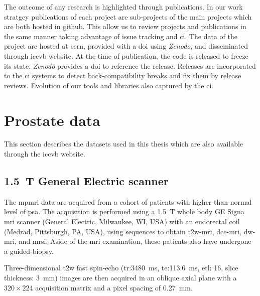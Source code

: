 The outcome of any research is highlighted through publications.
In our work stratgey publications of each project are sub-projects of the main projects which are both hosted in github.
This allow us to review projects and publications in the same manner taking advantage of issue tracking and \acs{ci}.
The data of the project are hosted at \acs{cern}, provided with a \acs{doi} using \emph{Zenodo}, and disseminated through \acs{iccvb} website.
At the time of publication, the code is released to freeze its state. 
\emph{Zenodo} provides a \acs{doi} to reference the release.
Releases are incorporated to the \acs{ci} systems to detect back-compatibility breaks and fix them by release reviews.
Evolution of our tools and libraries also captured by the \acs{ci}.

\section{Prostate data}
This section describes the datasets used in this thesis which are also available through the \acs{iccvb} website.

\subsection{\SI{1.5}{\tesla} General Electric scanner}

The \ac{mpmri} data are acquired from a cohort of patients with higher-than-normal level of \ac{psa}.
The acquisition is performed using a \SI{1.5}{\tesla} whole body GE Signa \ac{mri} scanner (General Electric, Milwaukee, WI, USA) with an endorectal coil (Medrad, Pittsburgh, PA, USA), using sequences to obtain \ac{t2w}-\ac{mri}, \ac{dce}-\ac{mri}, \ac{dw}-\ac{mri}, and \ac{mrsi}.
Aside of the \ac{mri} examination, these patients also have undergone a guided-biopsy.

Three-dimensional \ac{t2w} fast spin-echo (\ac{tr}:\SI{3480}{\ms}, \ac{te}:\SI{113.6}{\ms}, \ac{etl}: 16, slice thickness: \SI{3}{\mm}) images are then acquired in an oblique axial plane with a  $320 \times 224$ acquisition matrix and a pixel spacing of \SI{0.27}{\milli\metre}.

